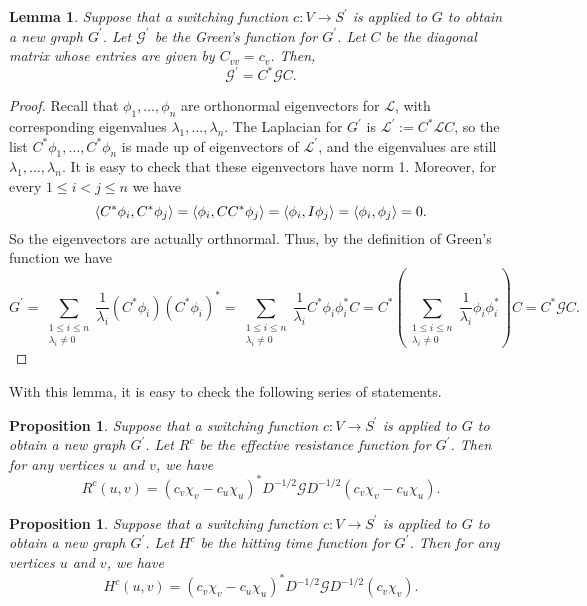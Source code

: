\documentclass[12pt]{article}
\newtheorem{prop}[thm]{Proposition}
\newtheorem{lem}[thm]{Lemma}
\theoremstyle{definition}
\newcommand{\lap}{\mathcal{L}}
\newcommand{\green}{\mathcal{G}}
\DeclarePairedDelimiter\inner{\langle}{\rangle}
\begin{document}
\begin{lem}
Suppose that a switching function $c: V \rightarrow S^\prime$ is applied to $G$ to obtain a new graph $G^\prime$. Let $\green^\prime$ be the Green's function for $G^\prime$. Let $C$ be the diagonal matrix whose entries are given by $C_{vv} = c_v$. Then, $$\green^\prime = C^* \green C.$$
\end{lem}
\begin{proof}
Recall that $\phi_1, \dots, \phi_n$ are orthonormal eigenvectors for $\lap$, with corresponding eigenvalues $\lambda_1, \dots, \lambda_n$. The Laplacian for $G^\prime$ is $\lap^\prime := C^* \lap C$, so the list $C^* \phi_1, \dots, C^* \phi_n$ is made up of eigenvectors of $\lap^\prime$, and the eigenvalues are still $\lambda_1, \dots, \lambda_n$. It is easy to check that these eigenvectors have norm 1. Moreover, for every $1 \leq i < j \leq n$ we have
$$
\inner*{C^* \phi_i, C^* \phi_j} = \inner*{\phi_i, C C^* \phi_j} = \inner*{\phi_i, I \phi_j} = \inner*{\phi_i, \phi_j} = 0.
$$
So the eigenvectors are actually orthnormal. Thus, by the definition of Green's function we have
$$
G^\prime = \sum_{\substack{1 \leq i \leq n \\ \lambda_i \neq 0}} \frac{1}{\lambda_i} \left( C^* \phi_i \right) \left( C^* \phi_i \right)^*
= \sum_{\substack{1 \leq i \leq n \\ \lambda_i \neq 0}} \frac{1}{\lambda_i} C^* \phi_i \phi_i^* C
= C^* \left( \sum_{\substack{1 \leq i \leq n \\ \lambda_i \neq 0}} \frac{1}{\lambda_i} \phi_i \phi_i^* \right) C
= C^* \green C.
$$
\end{proof}

With this lemma, it is easy to check the following series of statements.

\begin{prop}
Suppose that a switching function $c: V \rightarrow S^\prime$ is applied to $G$ to obtain a new graph $G^\prime$. Let $R^c$ be the effective resistance function for $G^\prime$. Then for any vertices $u$ and $v$, we have $$R^c(u, v) = (c_v \chi_v - c_u \chi_u)^* D^{-1/2} \green D^{-1/2} (c_v \chi_v - c_u \chi_u).$$
\end{prop}

\begin{prop}
Suppose that a switching function $c: V \rightarrow S^\prime$ is applied to $G$ to obtain a new graph $G^\prime$. Let $H^c$ be the hitting time function for $G^\prime$. Then for any vertices $u$ and $v$, we have $$H^c(u, v) = (c_v \chi_v - c_u \chi_u)^* D^{-1/2} \green D^{-1/2} (c_v \chi_v).$$
\end{prop}
\end{document}
